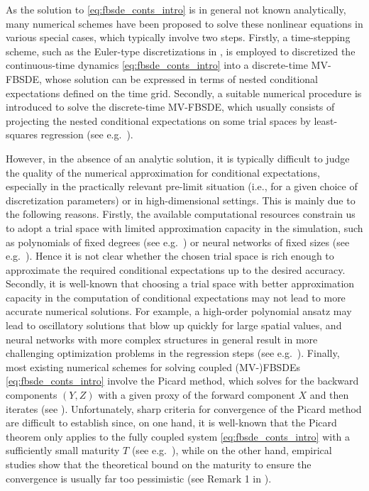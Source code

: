\documentclass[11pt]{article}
\numberwithin{equation}{section}
\theoremstyle{definition}
\theoremstyle{remark}
\begin{document}
As the solution to \eqref{eq:fbsde_conts_intro} is in general not known analytically, 
many numerical schemes have been proposed to solve these  nonlinear equations
in various special cases,
which  typically involve two steps.
Firstly, 
a  time-stepping scheme,
such as the  Euler-type discretizations  in  \cite{bouchard2004,zhang2004, bender2008,lionnet2015},
is employed to discretized  
the continuous-time dynamics
\eqref{eq:fbsde_conts_intro}  
into a discrete-time MV-FBSDE,
whose solution can be expressed 
in terms of  nested conditional expectations defined on the time grid.
Secondly,
 a suitable numerical procedure  is introduced to solve the  discrete-time MV-FBSDE,
which usually consists of  projecting the nested conditional expectations 
on some trial spaces by least-squares regression
(see e.g.~\cite{delarue2006,gobet2006, bender2008,chaudru2015,e2017,andrea2019,carmona2019,
chassagneux2019,fouque2019, germain2019, ji2020,robert2019,hure2020}).



However, in the absence of an analytic solution,
 it is typically difficult to judge the quality of   the  numerical approximation for conditional expectations,
 especially 
  in the practically relevant pre-limit situation
  (i.e., for a given choice of discretization parameters)
or in high-dimensional settings.
This is mainly 
 due to the following reasons.
Firstly, the available computational resources constrain us to adopt  
a trial space with  limited approximation capacity 
   in the simulation, 
such as polynomials  of fixed degrees  (see e.g.~\cite{bender2008}) or  neural networks of fixed sizes
(see e.g.~\cite{e2017,fouque2019,germain2019}).
Hence it is not clear whether the chosen trial space is 
rich enough to approximate the required conditional expectations
up to the desired accuracy.
Secondly,
 it is well-known that choosing a trial space with better approximation capacity
in the computation of conditional expectations 
may not lead to more accurate numerical solutions.
For example, a high-order  polynomial ansatz may lead to oscillatory solutions 
that blow up quickly for large spatial values,
and  
 neural networks with more complex structures 
in general result in more challenging optimization problems
in the regression steps
(see e.g.~\cite{gnoatto2020,ito2020}).
Finally, most existing numerical schemes for solving coupled (MV-)FBSDEs \eqref{eq:fbsde_conts_intro}
involve the Picard method, which solves for the backward components $(Y,Z)$ with a given  proxy of the forward component $X$
and then iterates
 (see \cite{delarue2006,bender2008,andrea2019,chassagneux2019}).
Unfortunately, 
sharp criteria for convergence of the Picard method are difficult to establish
since, on one hand, it is well-known that  the 
 Picard theorem only applies to the fully coupled system \eqref{eq:fbsde_conts_intro}
 with a sufficiently small maturity $T$ (see e.g.~\cite{andrea2019,chassagneux2019}),
while on the other hand,
empirical studies show that  the theoretical bound on the maturity  to ensure the convergence is usually far too pessimistic (see Remark 1 in \cite{germain2019}).
\end{document}
